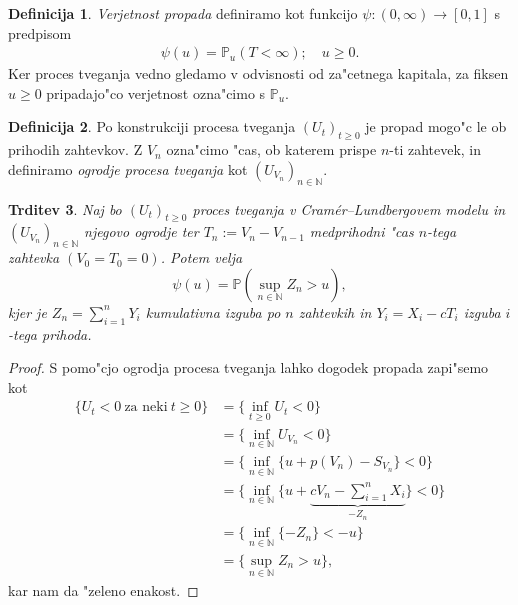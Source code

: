 \documentclass[12pt, a4paper, reqno]{amsart}
\theoremstyle{definition}
\newtheorem{definicija}{Definicija}[section]
\theoremstyle{plain}
\newtheorem{trditev}[definicija]{Trditev}
\newcommand{\N}{\mathbb{N}}
\newcommand{\Prob}{\mathbb{P}}
\newcommand{\1}{\mathds{1}}
\begin{document}
        \begin{definicija}
            \textit{Verjetnost propada} definiramo kot funkcijo $\psi: (0,\infty) \to [0,1]$ 
            s predpisom
            \begin{align*}
                \psi(u) = \Prob_u(T<\infty); \quad u\geq0.
            \end{align*}
            Ker proces tveganja vedno gledamo 
            v odvisnosti od  za"cetnega kapitala, za fiksen $u\geq0$ pripadajo"co verjetnost
            ozna"cimo s $\Prob_u$.
            \label{def:VerjetnostPropada}
        \end{definicija}

        \begin{definicija}
            Po konstrukciji procesa tveganja $(U_t)_{t\geq0}$ je propad mogo"c le ob 
            prihodih zahtevkov. %
            Z $V_n$ ozna"cimo "cas, ob katerem prispe $n$-ti zahtevek, in definiramo 
            \textit{ogrodje procesa tveganja} kot $(U_{V_n})_{n\in\N}$.
            \label{def:ogrodjeProcesaTveganja}
        \end{definicija}

        \begin{trditev}
            Naj bo $(U_t)_{t\geq0}$ proces tveganja v Cramér--Lundbergovem modelu in $(U_{V_n})_{n\in\N}$ 
            njegovo ogrodje ter $T_n := V_n - V_{n-1}$ medprihodni "cas $n$-tega zahtevka 
            $(V_0 = T_0 = 0)$. Potem velja 
            \begin{equation*}
                \psi(u) = \Prob\left(\sup_{n\in\N}Z_n > u\right),
            \end{equation*}
            kjer je $Z_n = \sum_{i=1}^nY_i$  kumulativna izguba po $n$ zahtevkih in $Y_i = X_i - cT_i$
            izguba $i$-tega prihoda.
            \label{trd:verjetnostPropadaZOgrodjem}
        \end{trditev}

        \begin{proof}

            S pomo"cjo ogrodja procesa tveganja lahko dogodek propada zapi"semo kot
            \begin{align*}
                \bigl\{U_t<0 \ \text{za neki} \ t\geq 0\bigr\} &= 
                                \biggl\{\inf_{t\geq0}U_t<0\biggr\} \\
                              &= \biggl\{\inf_{n\in\N}U_{V_n}<0\biggr\} \\
                              &= \biggl\{\inf_{n\in\N}\bigl\{u + p(V_n) - S_{V_n}\bigr\} < 0\biggr\} \\
                              &= \biggl\{\inf_{n\in\N}\biggl\{u + 
                              \underbrace{cV_n - \sum_{i=1}^nX_i}_{-Z_n}\biggr\} < 0\biggr\} \\
                              &= \biggl\{\inf_{n\in\N}\{-Z_n\} < -u\biggr\} \\
                              &= \biggl\{\sup_{n\in\N}Z_n > u\biggr\},
            \end{align*}
            kar nam da "zeleno enakost.
        \end{proof}
\end{document}
